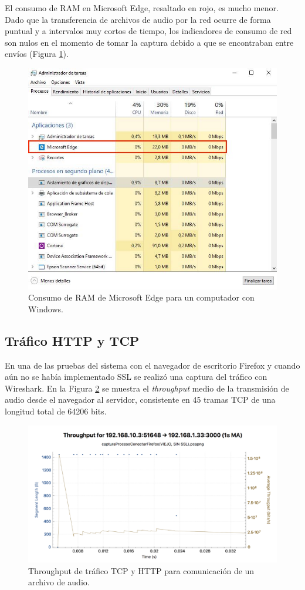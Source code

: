 El consumo de RAM en Microsoft Edge, resaltado en rojo, es mucho menor. Dado que la transferencia de archivos de audio por la red ocurre de forma puntual y a intervalos muy cortos de tiempo, los indicadores de consumo de red son nulos en el momento de tomar la captura debido a que se encontraban entre envíos (Figura \ref{edgeRAM}).

\begin{figure}[!t]
\begin{center}
\includegraphics[width=0.75\linewidth]{./6_EvalEmpirica/Img/edgeRAM.jpg}
\end{center}
\caption{Consumo de RAM de Microsoft Edge para un computador con Windows.}
\label{edgeRAM}
\end{figure}

\subsection{Tráfico HTTP y TCP}

En una de las pruebas del sistema con el navegador de escritorio Firefox y cuando aún no se había implementado SSL se realizó una captura del tráfico con Wireshark. En la Figura \ref{traffic} se muestra el \emph{throughput} medio de la transmisión de audio desde el navegador al servidor, consistente en 45 tramas TCP de una longitud total de 64206 bits.

\begin{figure}[!t]
\begin{center}
\includegraphics[width=0.75\linewidth]{./6_EvalEmpirica/Img/traffic.png}
\end{center}
\caption{Throughput de tráfico TCP y HTTP para comunicación de un archivo de audio.}
\label{traffic}
\end{figure}

